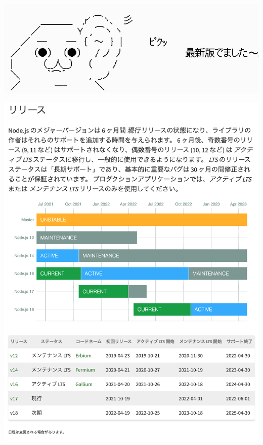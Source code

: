 \begin{reviewimage}[H]%
\includegraphics[width=1.0\maxwidth]{./images/01-createDevEnv/newRelease.png}%
\label{image:01-createDevEnv:newRelease}
\end{reviewimage}
\begin{reviewimage}[H]%
\includegraphics[width=1.0\maxwidth]{./images/01-createDevEnv/01_02nodejsRoadmap.png}%
\label{image:01-createDevEnv:01_02nodejsRoadmap}
\end{reviewimage}

